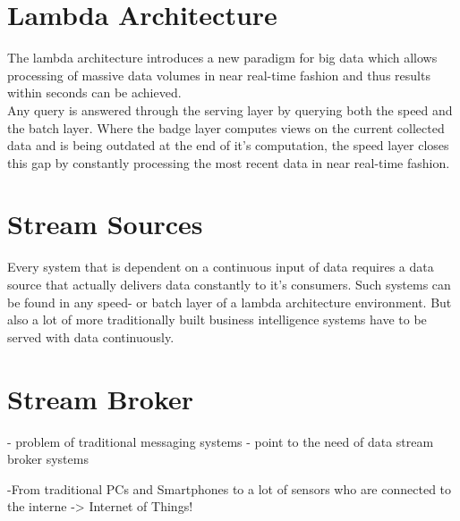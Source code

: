 

\section{Lambda Architecture}
The lambda architecture introduces a new paradigm for big data which allows
processing of massive data volumes in near real-time fashion and thus results within
seconds can be achieved. 
\\
Any query is answered through the serving layer by querying 
both the speed and the batch layer. Where the badge layer computes views on the current collected data and
is being outdated at the end of it's computation, the speed layer closes this 
gap by constantly processing the most recent data in near real-time fashion. 
\cite{marz2015big} \cite{PrpSvyOfDSPS}

\section{Stream Sources}
Every system that is dependent on a continuous input of data requires a data
source that actually delivers data constantly to it's consumers. Such systems
can be found in any speed- or batch layer of a lambda architecture environment. 
But also a lot of more traditionally built business intelligence systems have to be
served with data continuously.

\section{Stream Broker}


- problem of traditional messaging systems
- point to the need of data stream broker systems


-From traditional PCs and Smartphones to a lot of sensors who are connected to
the interne -> Internet of Things!



